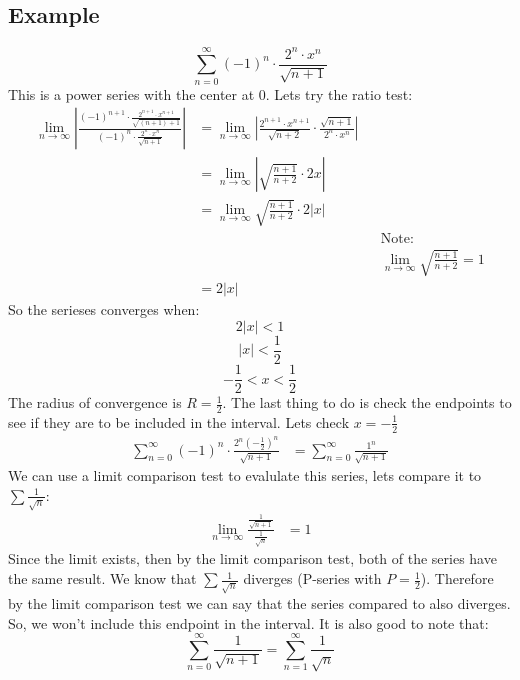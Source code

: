 \documentclass{article}
\begin{document}
    \subsection{Example}
        \[\sum_{n=0}^{\infty} (-1)^n \cdot \frac{2^n \cdot x^n}{\sqrt{n+1}}\]
        This is a power series with the center at \(0\).
        Lets try the ratio test:
        \begin{align*}
            \lim_{n \to \infty} \left| \frac{(-1)^{n+1} \cdot \frac{2^{n+1} \cdot x^{n+1}}{\sqrt{(n+1)+1}}}{(-1)^n \cdot \frac{2^n \cdot x^n}{\sqrt{n+1}}} \right|
            &= \lim_{n \to \infty} \left| \frac{2^{n+1} \cdot x^{n+1}}{\sqrt{n+2}} \cdot \frac{\sqrt{n+1}}{2^n \cdot x^n} \right| \\
            &= \lim_{n \to \infty} \left| \sqrt{\frac{n+1}{n+2}} \cdot 2x \right| \\
            &= \lim_{n \to \infty}  \sqrt{\frac{n+1}{n+2}} \cdot 2 |x| \\
            && &\text{Note:} \\
            && &\lim_{n \to \infty}  \sqrt{\frac{n+1}{n+2}} = 1 \\
            &=2|x|
        \end{align*}
        So the serieses converges when:
        \[2|x| < 1\]
        \[|x| < \frac{1}{2}\]
        \[- \frac{1}{2} < x < \frac{1}{2}\]
        The radius of convergence is \(R = \frac{1}{2}\).
        The last thing to do is check the endpoints to see if they are to be included in the interval.
        Lets check \(x = - \frac{1}{2}\)
        \begin{align*}
            \sum_{n=0}^{\infty} (-1)^n \cdot \frac{2^n(- \frac{1}{2})^n}{\sqrt{n+1}}
            &= \sum_{n=0}^{\infty} \frac{1^n}{\sqrt{n+1}}
        \end{align*}
        We can use a limit comparison test to evalulate this series, lets compare it to \(\sum \frac{1}{\sqrt{n}}\):
        \begin{align*}
            \lim_{n \to \infty} \frac{\frac{1}{\sqrt{n+1}}}{\frac{1}{\sqrt{n}}}
            &= 1
        \end{align*}
        Since the limit exists, then by the limit comparison test, both of the series have the same result.
        We know that \(\sum \frac{1}{\sqrt{n}}\) diverges (P-series with \(P = \frac{1}{2}\)).
        Therefore by the limit comparison test we can say that the series compared to also diverges.
        So, we won't include this endpoint in the interval.
        It is also good to note that:
        \[\sum_{n=0}^{\infty} \frac{1}{\sqrt{n+1}} = \sum_{n = 1}^{\infty} \frac{1}{\sqrt{n}}\]
\end{document}
